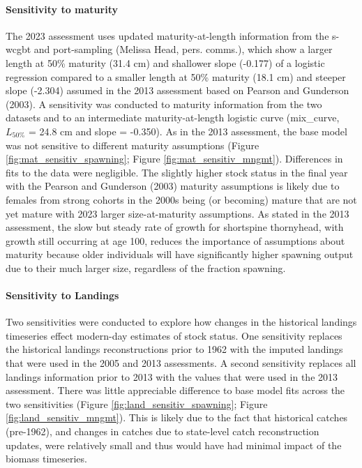 \documentclass[11pt,
  english,
  letterpaper,
]{article}
\begin{document}
\hypertarget{sensitivity-to-maturity}{%
\paragraph{Sensitivity to maturity}\label{sensitivity-to-maturity}}

The 2023 assessment uses updated maturity-at-length information from the \gls{s-wcgbt} and port-sampling (Melissa Head, pers. comms.), which show a larger length at 50\% maturity (31.4 cm) and shallower slope (-0.177) of a logistic regression compared to a smaller length at 50\% maturity (18.1 cm) and steeper slope (-2.304) assumed in the 2013 assessment based on Pearson and Gunderson (2003). A sensitivity was conducted to maturity information from the two datasets and to an intermediate maturity-at-length logistic curve (mix\_curve, \(L_{50\%}\) = 24.8 cm and slope = -0.350). As in the 2013 assessment, the base model was not sensitive to different maturity assumptions (Figure \ref{fig:mat_sensitiv_spawning}; Figure \ref{fig:mat_sensitiv_mngmt}). Differences in fits to the data were negligible. The slightly higher stock status in the final year with the Pearson and Gunderson (2003) maturity assumptions is likely due to females from strong cohorts in the 2000s being (or becoming) mature that are not yet mature with 2023 larger size-at-maturity assumptions. As stated in the 2013 assessment, the slow but steady rate of growth for shortspine thornyhead, with growth still occurring at age 100, reduces the importance of assumptions about maturity because older individuals will have significantly higher spawning output due to their much larger size, regardless of the fraction spawning.

\hypertarget{sensitivity-to-landings}{%
\paragraph{Sensitivity to Landings}\label{sensitivity-to-landings}}

Two sensitivities were conducted to explore how changes in the historical landings timeseries effect modern-day estimates of stock status. One sensitivity replaces the historical landings reconstructions prior to 1962 with the imputed landings that were used in the 2005 and 2013 assessments. A second sensitivity replaces all landings information prior to 2013 with the values that were used in the 2013 assessment. There was little appreciable difference to base model fits across the two sensitivities (Figure \ref{fig:land_sensitiv_spawning}; Figure \ref{fig:land_sensitiv_mngmt}). This is likely due to the fact that historical catches (pre-1962), and changes in catches due to state-level catch reconstruction updates, were relatively small and thus would have had minimal impact of the biomass timeseries.
\end{document}
